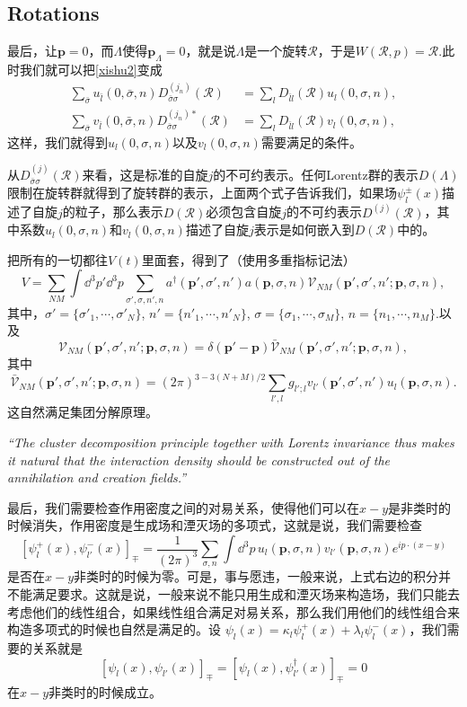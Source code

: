 \documentclass[10pt]{extbook}
\theoremstyle{plain}%
\newcommand{\re}[1]
	{\begin{center}
		\colorbox{shadecolor}{
		\begin{minipage}{135mm}
				\emph{``#1''}
			\end{minipage}}
	\end{center}}
\begin{document}
\subsection*{Rotations}
最后，让$\mathbf{p}=0$，而$\Lambda$使得$\mathbf{p}_\Lambda=0$，就是说$\Lambda$是一个旋转$\mathscr{R}$，于是$W(\mathscr{R},p)=\mathscr{R}$.此时我们就可以把\eqref{xishu2}变成
\[
	\begin{split}
		\sum_{\bar{\sigma}}u_{\bar{l}}(0,\bar{\sigma},n)D^{(j_n)}_{\bar{\sigma}\sigma}\left(\mathscr{R}\right) & =\sum_{l} D_{\bar{l}l}(\mathscr{R})u_{l}(0,\sigma,n),\\
		\sum_{\bar{\sigma}}v_{\bar{l}}(0,\bar{\sigma},n)D^{(j_n)*}_{\bar{\sigma}\sigma}\left(\mathscr{R}\right) & =\sum_{l} D_{\bar{l}l}(\mathscr{R})v_{l}(0,\sigma,n),
	\end{split}
\]
这样，我们就得到$u_{l}(0,\sigma,n)$以及$v_{l}(0,\sigma,n)$需要满足的条件。

从$D^{(j)}_{\bar{\sigma}\sigma}\left(\mathscr{R}\right)$来看，这是标准的自旋$j$的不可约表示。任何Lorentz群的表示$D(\Lambda)$限制在旋转群就得到了旋转群的表示，上面两个式子告诉我们，如果场$\psi^\pm_l(x)$描述了自旋$j$的粒子，那么表示$D(\mathscr{R})$必须包含自旋$j$的不可约表示$D^{(j)}\left(\mathscr{R}\right)$，其中系数$u_{l}(0,\sigma,n)$和$v_{l}(0,\sigma,n)$描述了自旋$j$表示是如何嵌入到$D(\mathscr{R})$中的。

把所有的一切都往$V(t)$里面套，得到了（使用多重指标记法）
\[
	V=\sum_{NM}\int \dd^3 p'\dd^3 p \sum_{\sigma',\sigma,n',n}a^\dag(\mathbf{p}',\sigma',n')a(\mathbf{p},\sigma,n)\mathscr{V}_{NM}(\mathbf{p}',\sigma',n';\mathbf{p},\sigma,n),
\]
其中，$\sigma'=\{\sigma'_1,\cdots,\sigma'_N\}$, $n'=\{n'_1,\cdots,n'_N\}$, $\sigma=\{\sigma_1,\cdots,\sigma_M\}$, $n=\{n_1,\cdots,n_M\}$.以及
\[
	\mathscr{V}_{NM}(\mathbf{p}',\sigma',n';\mathbf{p},\sigma,n)=\delta(\mathbf{p}'-\mathbf{p})\bar{\mathscr{V}}_{NM}(\mathbf{p}',\sigma',n';\mathbf{p},\sigma,n),
\]
其中
\[
	\bar{\mathscr{V}}_{NM}(\mathbf{p}',\sigma',n';\mathbf{p},\sigma,n)=(2\pi)^{3-3(N+M)/2}\sum_{l',l}g_{l';l}v_{l'}(\mathbf{p}',\sigma',n')u_l(\mathbf{p},\sigma,n).
\]
这自然满足集团分解原理。
\re{The cluster decomposition principle together with Lorentz invariance thus makes it natural that the interaction density should be constructed out of the annihilation and creation fields.}

最后，我们需要检查作用密度之间的对易关系，使得他们可以在$x-y$是非类时的时候消失，作用密度是生成场和湮灭场的多项式，这就是说，我们需要检查
\[
	[\psi_l^+(x),\psi_{l'}^-(x)]_{\mp}=\frac{1}{(2\pi)^3}\sum_{\sigma,n}\int\dd^3 p\, u_{l}(\mathbf{p},\sigma,n)v_{l'}(\mathbf{p},\sigma,n)e^{ip\cdot (x-y)}
\]
是否在$x-y$非类时的时候为零。可是，事与愿违，一般来说，上式右边的积分并不能满足要求。这就是说，一般来说不能只用生成和湮灭场来构造场，我们只能去考虑他们的线性组合，如果线性组合满足对易关系，那么我们用他们的线性组合来构造多项式的时候也自然是满足的。设
$\psi_l(x)=\kappa_l\psi_l^+(x)+\lambda_l\psi_l^-(x)$，我们需要的关系就是
\[
	[\psi_l(x),\psi_{l'}(x)]_{\mp}=[\psi_l(x),\psi^\dag_{l'}(x)]_{\mp}=0
\]
在$x-y$非类时的时候成立。
\end{document}
